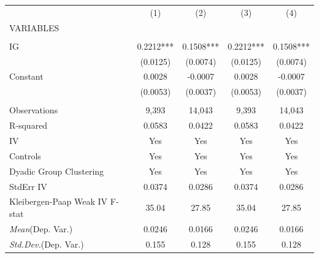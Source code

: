 \documentclass[]{article}
\begin{document}
\begin{tabular}{lcccc} \hline
 & (1) & (2) & (3) & (4) \\
VARIABLES &  &  &  &  \\ \hline
 &  &  &  &  \\
IG & 0.2212*** & 0.1508*** & 0.2212*** & 0.1508*** \\
 & (0.0125) & (0.0074) & (0.0125) & (0.0074) \\
Constant & 0.0028 & -0.0007 & 0.0028 & -0.0007 \\
 & (0.0053) & (0.0037) & (0.0053) & (0.0037) \\
 &  &  &  &  \\
Observations & 9,393 & 14,043 & 9,393 & 14,043 \\
R-squared & 0.0583 & 0.0422 & 0.0583 & 0.0422 \\
IV & Yes & Yes & Yes & Yes \\
Controls & Yes & Yes & Yes & Yes \\
Dyadic Group Clustering & Yes & Yes & Yes & Yes \\
StdErr IV & 0.0374 & 0.0286 & 0.0374 & 0.0286 \\
Kleibergen-Paap Weak IV F-stat & 35.04 & 27.85 & 35.04 & 27.85 \\
\textit{Mean}(Dep. Var.) & 0.0246 & 0.0166 & 0.0246 & 0.0166 \\
 \textit{Std.Dev.}(Dep. Var.) & 0.155 & 0.128 & 0.155 & 0.128 \\ \hline
\end{tabular}
\end{document}
